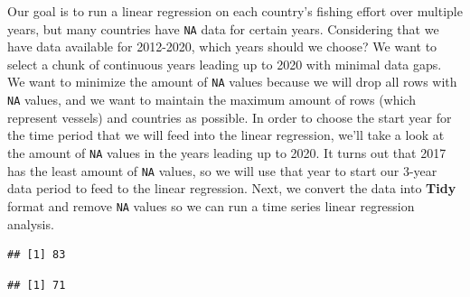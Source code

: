 \documentclass[
]{article}
\newenvironment{Shaded}{\begin{snugshade}}{\end{snugshade}}
\newcommand{\CommentTok}[1]{\textcolor[rgb]{0.56,0.35,0.01}{\textit{#1}}}
\newcommand{\FunctionTok}[1]{\textcolor[rgb]{0.00,0.00,0.00}{#1}}
\newcommand{\NormalTok}[1]{#1}
\newcommand{\SpecialCharTok}[1]{\textcolor[rgb]{0.00,0.00,0.00}{#1}}
\newcommand{\StringTok}[1]{\textcolor[rgb]{0.31,0.60,0.02}{#1}}
\begin{document}
Our goal is to run a linear regression on each country's fishing effort
over multiple years, but many countries have \texttt{NA} data for
certain years. Considering that we have data available for 2012-2020,
which years should we choose? We want to select a chunk of continuous
years leading up to 2020 with minimal data gaps. We want to minimize the
amount of \texttt{NA} values because we will drop all rows with
\texttt{NA} values, and we want to maintain the maximum amount of rows
(which represent vessels) and countries as possible. In order to choose
the start year for the time period that we will feed into the linear
regression, we'll take a look at the amount of \texttt{NA} values in the
years leading up to 2020. It turns out that 2017 has the least amount of
\texttt{NA} values, so we will use that year to start our 3-year data
period to feed to the linear regression. Next, we convert the data into
\textbf{Tidy} format and remove \texttt{NA} values so we can run a time
series linear regression analysis.

\begin{Shaded}
\end{Shaded}

\begin{verbatim}
## [1] 83
\end{verbatim}

\begin{Shaded}
\end{Shaded}

\begin{verbatim}
## [1] 71
\end{verbatim}

\begin{Shaded}
\end{Shaded}
\end{document}
